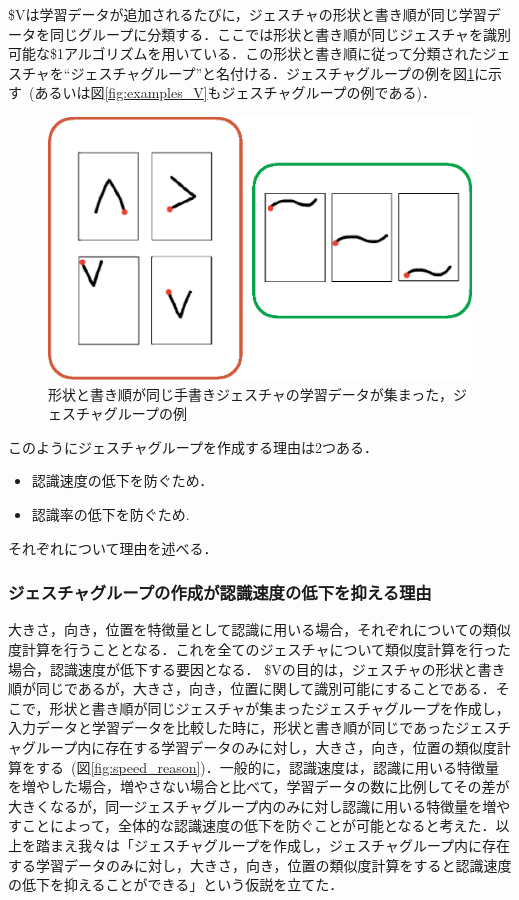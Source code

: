 \$Vは学習データが追加されるたびに，ジェスチャの形状と書き順が同じ学習データを同じグループに分類する．ここでは形状と書き順が同じジェスチャを識別可能な\$1アルゴリズムを用いている．この形状と書き順に従って分類されたジェスチャを``ジェスチャグループ''と名付ける．ジェスチャグループの例を図\ref{fig:gesture_group}に示す~(あるいは図\ref{fig:examples_V}もジェスチャグループの例である)．

\begin{figure} [h!]
	\begin{center}
		\includegraphics [width=0.7\hsize ]{img/gesture_group.eps}
	\end{center}
	\caption{形状と書き順が同じ手書きジェスチャの学習データが集まった，ジェスチャグループの例}
	\label{fig:gesture_group}
\end{figure}

このようにジェスチャグループを作成する理由は2つある．
\begin{itemize}
\item 認識速度の低下を防ぐため．
\item 認識率の低下を防ぐため.
\end{itemize}
それぞれについて理由を述べる．


\subsubsection{ジェスチャグループの作成が認識速度の低下を抑える理由}

大きさ，向き，位置を特徴量として認識に用いる場合，それぞれについての類似度計算を行うこととなる．これを全てのジェスチャについて類似度計算を行った場合，認識速度が低下する要因となる．
\$Vの目的は，ジェスチャの形状と書き順が同じであるが，大きさ，向き，位置に関して識別可能にすることである．そこで，形状と書き順が同じジェスチャが集まったジェスチャグループを作成し，入力データと学習データを比較した時に，形状と書き順が同じであったジェスチャグループ内に存在する学習データのみに対し，大きさ，向き，位置の類似度計算をする~(図\ref{fig:speed_reason})．一般的に，認識速度は，認識に用いる特徴量を増やした場合，増やさない場合と比べて，学習データの数に比例してその差が大きくなるが，同一ジェスチャグループ内のみに対し認識に用いる特徴量を増やすことによって，全体的な認識速度の低下を防ぐことが可能となると考えた．以上を踏まえ我々は「ジェスチャグループを作成し，ジェスチャグループ内に存在する学習データのみに対し，大きさ，向き，位置の類似度計算をすると認識速度の低下を抑えることができる」という仮説を立てた．

